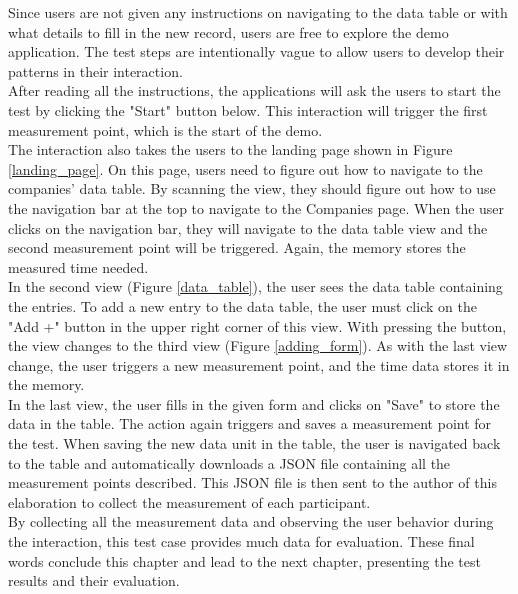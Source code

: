 Since users are not given any instructions on navigating to the data table or with what details to fill in the new record, users are free to explore the demo application. The test steps are intentionally vague to allow users to develop their patterns in their interaction.  \\
After reading all the instructions, the applications will ask the users to start the test by clicking the "Start" button below. This interaction will trigger the first measurement point, which is the start of the demo. \\
The interaction also takes the users to the landing page shown in Figure \ref{landing_page}. On this page, users need to figure out how to navigate to the companies' data table. By scanning the view, they should figure out how to use the navigation bar at the top to navigate to the Companies page. When the user clicks on the navigation bar, they will navigate to the data table view and the second measurement point will be triggered. Again, the memory stores the measured time needed. \\
In the second view (Figure \ref{data_table}), the user sees the data table containing the entries. To add a new entry to the data table, the user must click on the "Add +" button in the upper right corner of this view. With pressing the button, the view changes to the third view (Figure \ref{adding_form}). As with the last view change, the user triggers a new measurement point, and the time data stores it in the memory.  \\ 
In the last view, the user fills in the given form and clicks on "Save" to store the data in the table. The action again triggers and saves a measurement point for the test. When saving the new data unit in the table, the user is navigated back to the table and automatically downloads a JSON file containing all the measurement points described. This JSON file is then sent to the author of this elaboration to collect the measurement of each participant. \\

By collecting all the measurement data and observing the user behavior during the interaction, this test case provides much data for evaluation. These final words conclude this chapter and lead to the next chapter, presenting the test results and their evaluation. 